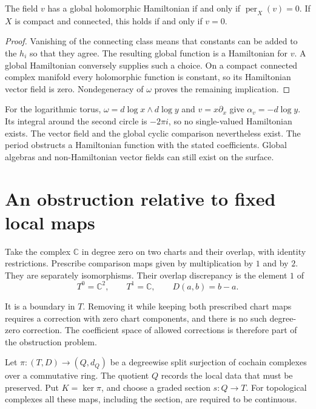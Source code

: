 \begin{proposition}\label{mht:prop:global-hamiltonian-period}
The field $v$ has a global holomorphic Hamiltonian if and only if
$\operatorname{per}_X(v)=0$. If $X$ is compact and connected, this
holds if and only if $v=0$.
\end{proposition}

\begin{proof}
Vanishing of the connecting class means that constants can be
added to the $h_i$ so that they agree. The resulting global function
is a Hamiltonian for $v$. A global Hamiltonian conversely supplies
such a choice. On a compact connected complex manifold every
holomorphic function is constant, so its Hamiltonian vector field
is zero. Nondegeneracy of $\omega$ proves the remaining implication.
\end{proof}

For the logarithmic torus, $\omega=d\log x\wedge d\log y$ and
$v=x\partial_x$ give $\alpha_v=-d\log y$. Its integral around the
second circle is $-2\pi i$, so no single-valued Hamiltonian exists.
The vector field and the global cyclic comparison nevertheless
exist. The period obstructs a Hamiltonian function with the stated
coefficients. Global algebras and non-Hamiltonian vector fields can
still exist on the surface.

\section{An obstruction relative to fixed local maps}

Take the complex $\mathbb C$ in degree zero on two charts and their
overlap, with identity restrictions. Prescribe comparison maps
given by multiplication by $1$ and by $2$. They are separately
isomorphisms. Their overlap discrepancy is the element $1$ of
\[
 T^0=\mathbb C^2,\qquad T^1=\mathbb C,
 \qquad D(a,b)=b-a.
\]

It is a boundary in $T$. Removing it while keeping both prescribed
chart maps requires a correction with zero chart components, and
there is no such degree-zero correction. The coefficient space of
allowed corrections is therefore part of the obstruction problem.

Let $\pi:(T,D)\to(Q,d_Q)$ be a degreewise split surjection of
cochain complexes over a commutative ring. The quotient $Q$ records
the local data that must be preserved. Put $K=\ker\pi$, and choose
a graded section $s:Q\to T$. For topological complexes all these
maps, including the section, are required to be continuous.

